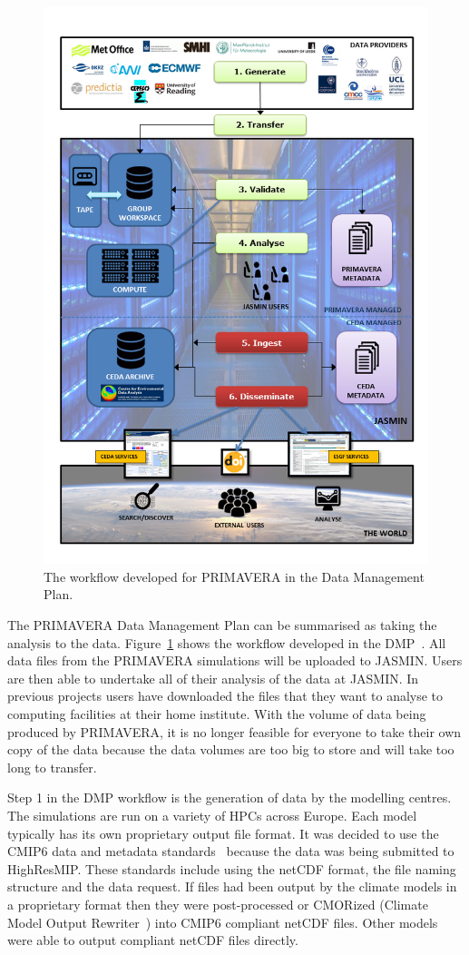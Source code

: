 \documentclass[gmd, manuscript]{copernicus}
\begin{document}
\begin{figure}[t]
\includegraphics[width=12cm]{fig01.png}
\caption{The workflow developed for PRIMAVERA in the Data Management Plan.}
\label{dmp_workflow}
\end{figure}

The PRIMAVERA Data Management Plan can be summarised as taking the analysis to the data. Figure~\ref{dmp_workflow} shows the workflow developed in the DMP~\citep{Mizielinski2016}. All data files from the PRIMAVERA simulations will be uploaded to JASMIN. Users are then able to undertake all of their analysis of the data at JASMIN. In previous projects users have downloaded the files that they want to analyse to computing facilities at their home institute. With the volume of data being produced by PRIMAVERA, it is no longer feasible for everyone to take their own copy of the data because the data volumes are too big to store and will take too long to transfer.

Step 1 in the DMP workflow is the generation of data by the modelling centres. The simulations are run on a variety of HPCs across Europe. Each model typically has its own proprietary output file format. It was decided to use the CMIP6 data and metadata standards~\citep{gmd-11-3659-2018} because the data was being submitted to HighResMIP. These standards include using the netCDF format, the file naming structure and the data request. If files had been output by the climate models in a proprietary format then they were post-processed or CMORized (Climate Model Output Rewriter~\citep{Nadeau2019}) into CMIP6 compliant netCDF files. Other models were able to output compliant netCDF files directly.
\end{document}
